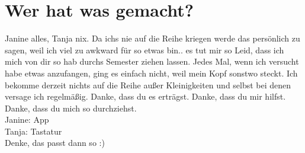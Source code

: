 \documentclass[11pt]{article}
\begin{document}
	
\section{Wer hat was gemacht?}
	Janine alles, Tanja nix.
	Da ichs nie auf die Reihe kriegen werde das persönlich zu sagen, weil ich viel zu awkward für so etwas bin.. es tut mir so Leid, dass ich mich von dir so hab durchs Semester ziehen lassen. Jedes Mal, wenn ich versucht habe etwas anzufangen, ging es einfach nicht, weil mein Kopf sonstwo steckt. Ich bekomme derzeit nichts auf die Reihe außer Kleinigkeiten und selbst bei denen versage ich regelmäßig.
	Danke, dass du es erträgst. Danke, dass du mir hilfst. Danke, dass du mich so durchziehst. \bigskip\\
	Janine: App\\
	Tanja: Tastatur\\
	Denke, das passt dann so :)

	
	
\end{document}
